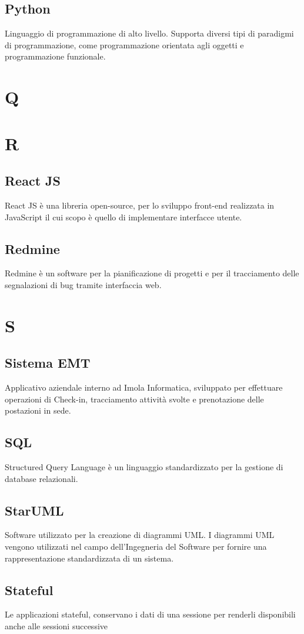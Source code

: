 \subsection{Python}
Linguaggio di programmazione di alto livello. Supporta diversi tipi di paradigmi di programmazione, come programmazione
orientata agli oggetti e programmazione funzionale.
\newpage
\section{Q}
\section{R}
\subsection{React JS}
React JS è una libreria open-source, per lo sviluppo front-end realizzata in JavaScript il cui scopo è quello di implementare interfacce utente.
\subsection{Redmine}
Redmine è un software per la pianificazione di progetti e per il tracciamento delle segnalazioni di bug tramite interfaccia web.
\newpage
\section{S}
\subsection{Sistema EMT}
Applicativo aziendale interno ad Imola Informatica, sviluppato per effettuare operazioni di Check-in, tracciamento attività svolte e prenotazione delle postazioni in sede.
\subsection{SQL}
Structured Query Language è un linguaggio standardizzato per la gestione di database relazionali.
\subsection{StarUML}
Software utilizzato per la creazione di diagrammi UML. I diagrammi UML vengono utilizzati nel campo dell'Ingegneria del Software per fornire una rappresentazione standardizzata di un sistema.
\subsection{Stateful}
Le applicazioni stateful, conservano i dati di una sessione per renderli disponibili anche alle sessioni successive
